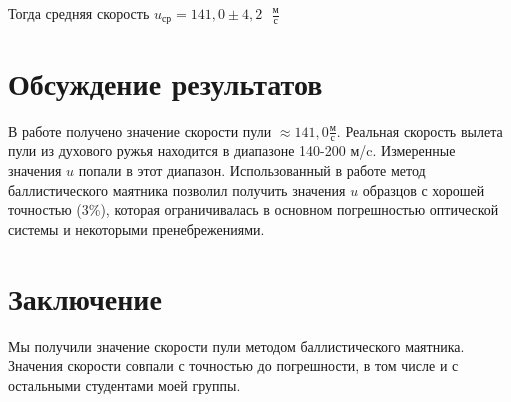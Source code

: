 \documentclass[
	a4paper, %
	12pt, %
]{article}
\begin{document}
	Тогда средняя скорость $u_\text{ср} = 141,0 \pm 4,2\text{ }\frac{\text{м}}{\text{с}} $
	
	\section{Обсуждение результатов}
	В работе получено значение скорости пули $\approx 141,0 \frac{\text{м}}{\text{с}}$. Реальная скорость вылета пули из духового ружья находится в диапазоне 140-200 м/c. Измеренные значения $u$ попали в этот диапазон.
	Использованный в работе метод баллистического маятника позволил получить значения $u$ образцов с хорошей точностью ({3}\%), которая ограничивалась в основном погрешностью оптической системы и некоторыми пренебрежениями.
	\section{Заключение}
	Мы получили значение скорости пули методом баллистического маятника. Значения скорости совпали с точностью до погрешности, в том числе и с остальными студентами моей группы.
	
	
\end{document}
